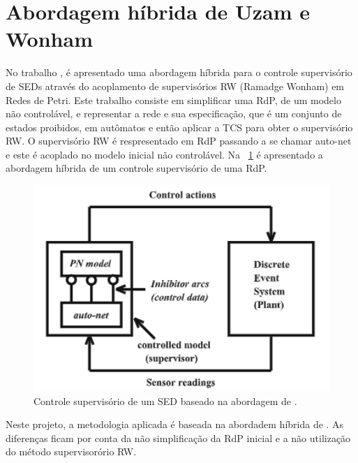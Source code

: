 \section{Abordagem h\'ibrida de Uzam e Wonham}

No trabalho \cite{UzamWonham2005}, \'e apresentado uma abordagem h\'ibrida para o controle supervis\'orio de SEDs atrav\'es do acoplamento de supervis\'orios RW (Ramadge Wonham) em Redes de Petri. Este trabalho consiste em simplificar uma RdP, de um modelo n\~ao control\'avel, e representar a rede e sua especifica\c{c}\~ao, que \'e um conjunto de estados proibidos, em aut\^omatos e ent\~ao aplicar a TCS para obter o supervis\'orio RW. O supervis\'orio RW \'e respresentado em RdP passando a se chamar auto-net e este \'e acoplado no modelo inicial n\~ao control\'avel. Na ~\ref{fig:uzamcontrol} \'e apresentado a abordagem h\'ibrida de um controle supervis\'orio de uma RdP.

\begin{figure}[!htb]
	\caption[Controle supervis\'orio de um SED baseado na abordagem de \cite{UzamWonham2005}.]{Controle supervis\'orio de um SED baseado na abordagem de \cite{UzamWonham2005}.}
	\label{fig:uzamcontrol}
	\includegraphics[width=16cm]{./figuras/UZAMCONTROL.png}\centering
\end{figure}

Neste projeto, a metodologia aplicada \'e baseada na abordadem h\'ibrida de \cite{UzamWonham2005}. As diferen\c{c}as ficam por conta da n\~ao simplifica\c{c}\~ao da RdP inicial e a n\~ao utiliza\c{c}\~ao do m\'etodo supervisor\'orio RW.





